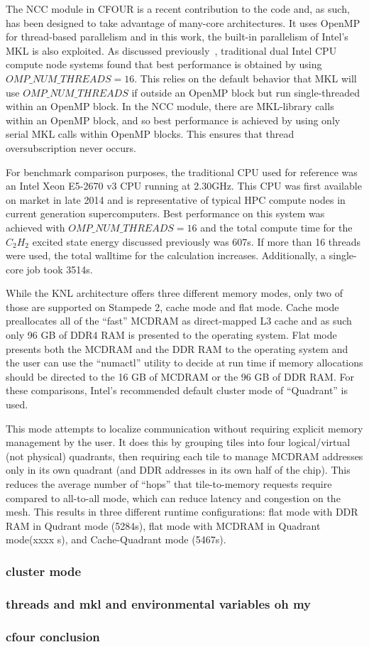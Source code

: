 The NCC module in CFOUR is a recent contribution to the code and, as such, has been designed to take
advantage of many-core architectures. It uses OpenMP for thread-based parallelism and in this work, the
built-in parallelism of Intel's MKL is also exploited. As discussed previously~\cite{ncc:15},
traditional dual Intel CPU compute node systems found that best performance is obtained 
by using $OMP\_NUM\_THREADS=16$. This relies on the default behavior that MKL will use $OMP\_NUM\_THREADS$ 
if outside an OpenMP block but run single-threaded within an OpenMP block. 
In the NCC module, there are MKL-library 
calls within an OpenMP block, and so best performance is achieved by using only serial MKL calls within OpenMP
blocks. This ensures that thread oversubscription never occurs.

For benchmark comparison purposes, the traditional CPU used for reference was an Intel Xeon E5-2670 v3 CPU
running at 2.30GHz. This CPU was first available on market in late 2014 and is representative of typical HPC 
compute nodes in current generation supercomputers. Best performance on this system was achieved with 
$OMP\_NUM\_THREADS=16$ and the total compute time for the $C_2H_2$ excited state energy discussed previously
was 607s. 
If more than 16 threads were used, the total walltime for the calculation increases. Additionally,
a single-core job took 3514s.

While the KNL architecture offers three different memory modes, only two of those are supported on Stampede 2,
cache mode and flat mode. Cache mode preallocates all of the ``fast'' MCDRAM as direct-mapped L3 cache and
as such only 96 GB of DDR4 RAM is presented to the operating system. Flat mode presents both the MCDRAM and the 
DDR RAM to the operating system and the user can use the ``numactl'' utility to decide at run time if memory 
allocations should be directed to the 16 GB of MCDRAM or the 96 GB of DDR RAM. For these comparisons, Intel's 
recommended default cluster mode of ``Quadrant'' is used. 

This mode attempts to localize communication without requiring explicit memory management by the user. 
It does this by grouping tiles into four logical/virtual (not physical) quadrants, then requiring each tile 
to manage MCDRAM addresses only in its own quadrant (and DDR addresses in its own half of the chip). 
This reduces the average number of ``hops'' that tile-to-memory requests require compared to all-to-all mode, 
which can reduce latency and congestion on the mesh.  This results in three different runtime configurations: 
flat mode with DDR RAM in Qudrant mode (5284s), flat mode with MCDRAM in Quadrant mode(xxxx s), and 
Cache-Quadrant mode (5467s).
\subsubsection{cluster mode}
\subsubsection{threads and mkl and environmental variables oh my}
\subsubsection{cfour conclusion}
